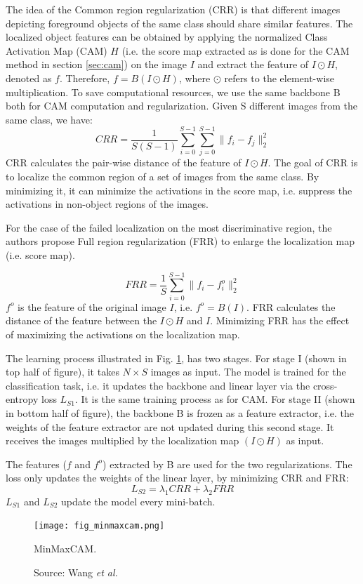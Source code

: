 The idea of the Common region regularization (CRR) is that different images depicting foreground objects of the same class should share similar features. The localized object features can be obtained by applying the normalized Class Activation Map (CAM) $H$ (i.e. the score map extracted as is done for the CAM method in section \ref{sec:cam}) on the image $I$ and extract the feature of $I \odot H$, denoted as $f$. Therefore, $f = B(I \odot H)$, where $\odot$ refers to the element-wise multiplication. To save computational resources, we use the same backbone B both for CAM computation and regularization. Given S different images from the same class, we have:
\begin{equation}
    CRR = \frac{1}{S(S-1)} \sum^{S-1}_{i=0} \sum^{S-1}_{j=0} \lVert f_i - f_j \rVert^2_2
\end{equation}
CRR calculates the pair-wise distance of the feature of $I \odot H$. The goal of CRR is to localize the common region of a set of images from the same class. By minimizing it, it can minimize the activations in the score map, i.e. suppress the activations in non-object regions of the images.

For the case of the failed localization on the most discriminative region, the authors propose Full region regularization (FRR) to enlarge the localization map (i.e. score map).

\begin{equation}
    FRR = \frac{1}{S} \sum^{S-1}_{i=0}\lVert f_i - f^o_i \rVert^2_2
\end{equation}
$f^o$ is the feature of the original image $I$, i.e. $f^o=B(I)$. FRR calculates the distance of the feature between the $I \odot H$ and $I$. Minimizing FRR has the effect of maximizing the activations on the localization map.

The learning process illustrated in Fig. \ref{fig:minmaxcam}, has two stages. For stage I (shown in top half of figure), it takes $N \times S$ images as input. The model is trained for the classification task, i.e. it updates the backbone and linear layer via the cross-entropy loss $L_{S1}$. It is the same training process as for CAM. For stage II (shown in bottom half of figure), the backbone B is frozen as a feature extractor, i.e. the weights of the feature extractor are not updated during this second stage. It receives the images multiplied by the localization map $(I \odot H)$ as input.

The features ($f$ and $f^o$) extracted by B are used for the two regularizations. The loss only updates the weights of the linear layer, by minimizing CRR and FRR:
\begin{equation}
    L_{S2} = \lambda_{1}CRR + \lambda_{2}FRR
\end{equation} 
$L_{S1}$ and $L_{S2}$ update the model every mini-batch.
\begin{figure}[ht]
    \begin{center}       
    \texttt{[image: fig\_minmaxcam.png]}
    \caption[MinMaxCAM]{MinMaxCAM.}
    \caption*{Source: Wang \textit{et al.} \cite{wang2021minmaxcam}}
    \label{fig:minmaxcam}
    \end{center}
\end{figure}

